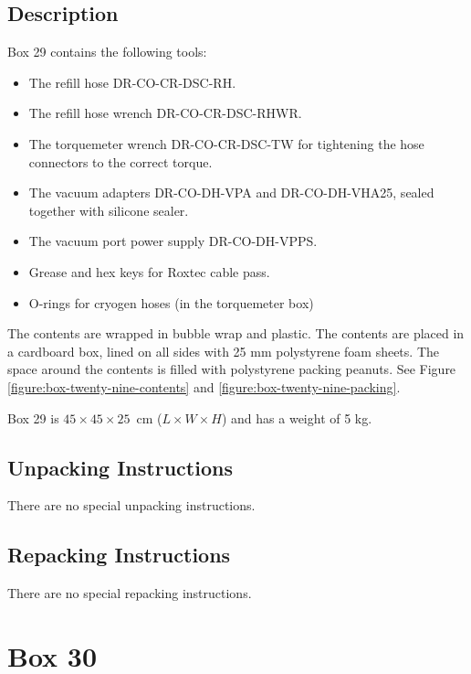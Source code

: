 \documentclass{article}
\begin{document}
\subsection{Description}

Box 29 contains the following tools:

\begin{itemize}
    \item The refill hose DR-CO-CR-DSC-RH.
    \item The refill hose wrench DR-CO-CR-DSC-RHWR.
    \item The torquemeter wrench DR-CO-CR-DSC-TW for tightening the hose connectors to the correct torque.
    \item The vacuum adapters DR-CO-DH-VPA and DR-CO-DH-VHA25, sealed together with silicone sealer.
    \item The vacuum port power supply DR-CO-DH-VPPS.
    \item Grease and hex keys for Roxtec cable pass.
    \item O-rings for cryogen hoses (in the torquemeter box)
\end{itemize}

The contents are wrapped in bubble wrap and plastic.  The contents are placed in a cardboard box, lined on all sides with 25 mm polystyrene foam sheets. The space around the contents is filled with polystyrene packing peanuts. See Figure \ref{figure:box-twenty-nine-contents} and \ref{figure:box-twenty-nine-packing}.

Box 29 is $45 \times 45 \times 25$~cm ($L \times W \times H$) and has a weight of 5 kg.

\subsection{Unpacking Instructions}

There are no special unpacking instructions.

\subsection{Repacking Instructions}

There are no special repacking instructions.


\clearpage
\section{Box 30}
\end{document}
